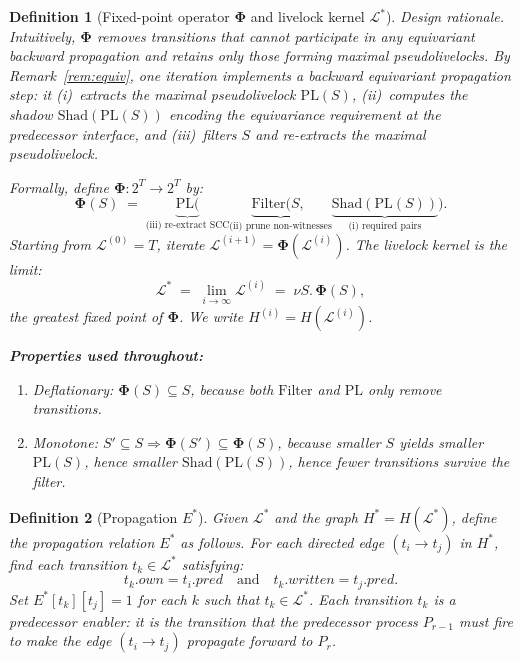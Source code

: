 \documentclass{article}
\newtheorem{definition}{Definition}
\newcommand{\Ls}{\mathcal{L}^{*}}
\newcommand{\Li}[1]{\mathcal{L}^{(#1)}}   %
\newcommand{\Hi}[1]{H^{(#1)}}             %
\newcommand{\PL}{\mathrm{PL}}
\newcommand{\Shad}{\mathrm{Shad}}
\newcommand{\Filter}{\mathrm{Filter}}
\newcommand{\bPhi}{\boldsymbol{\Phi}}
\newcommand{\Hstar}{H^{*}}
\newcommand{\Estar}{E^{*}}
\newcommand{\own}{\mathit{own}}
\newcommand{\writ}{\mathit{written}}
\newcommand{\pred}{\mathit{pred}}
\begin{document}
\begin{definition}[Fixed-point operator $\bPhi$ and livelock kernel $\Ls$]
\label{def:phi}
\emph{Design rationale.}
Intuitively, $\bPhi$ removes transitions that cannot participate in any
equivariant backward propagation and retains only those forming maximal
pseudolivelocks.  By Remark~\ref{rem:equiv}, one iteration implements a
backward equivariant propagation step: it (i)~extracts the maximal
pseudolivelock $\PL(S)$, (ii)~computes the shadow $\Shad(\PL(S))$
encoding the equivariance requirement at the predecessor interface, and
(iii)~filters $S$ and re-extracts the maximal pseudolivelock.

Formally, define $\bPhi : 2^T \to 2^T$ by:
\[
  \bPhi(S)
  \;=\; \underbrace{\PL\!\bigl(}_{\text{(iii) re-extract SCC}}
         \underbrace{\Filter(S,\;}_{\text{(ii) prune non-witnesses}}
         \underbrace{\Shad(\PL(S))}_{\text{(i) required pairs}}
         \bigr).
\]
Starting from $\Li{0}=T$, iterate $\Li{i+1}=\bPhi(\Li{i})$.
The \emph{livelock kernel} is the limit:
\[
  \Ls \;=\; \lim_{i\to\infty}\Li{i} \;=\; \nu S.\,\bPhi(S),
\]
the greatest fixed point of $\bPhi$.  We write $\Hi{i}=H(\Li{i})$.

\noindent\textbf{Properties used throughout:}
\begin{enumerate}
  \item[\textbf{(D)}] \emph{Deflationary:} $\bPhi(S)\subseteq S$,
        because both $\Filter$ and $\PL$ only remove transitions.
  \item[\textbf{(M)}] \emph{Monotone:} $S'\!\subseteq\!S \Rightarrow
        \bPhi(S')\!\subseteq\!\bPhi(S)$, because smaller $S$ yields
        smaller $\PL(S)$, hence smaller $\Shad(\PL(S))$, hence fewer
        transitions survive the filter.
\end{enumerate}
\end{definition}

\begin{definition}[Propagation $\Estar$]
\label{def:E}
Given $\Ls$ and the graph $\Hstar = H(\Ls)$, define the
\emph{propagation relation} $\Estar$ as follows. For each directed edge
$(t_i\to t_j)$ in $\Hstar$, find each transition $t_k\in\Ls$
satisfying:
\[
  t_k.\own = t_i.\pred \quad\text{and}\quad t_k.\writ = t_j.\pred.
\]
Set $\Estar[t_k][t_j]=1$ for each $k$ such that $t_k \in \Ls$. Each transition
$t_k$ is a \emph{predecessor enabler}: it is the transition that the
predecessor process $P_{r-1}$ must fire to make the edge $(t_i\to t_j)$
propagate forward to $P_r$.
\end{definition}
\end{document}
